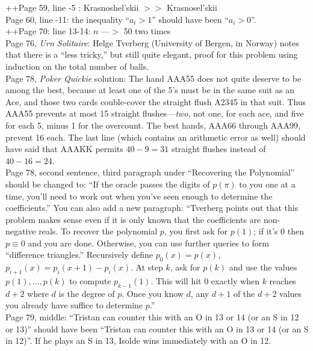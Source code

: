 \documentclass[11pt]{article}
\begin{document}
++Page 59, line -5 :  Krasnoshel'skii $>>$ Krasnosel'skii \\

Page 60, line -11: the inequality ``$a_i>1$'' should have been ``$a_i>0$''.\\

++Page 70: line 13-14: $n$ ---$>$ 50 two times\\ 

Page 76, {\em Urn Solitaire}: Helge Tverberg (University of Bergen, in Norway) notes
that there is a ``less tricky,'' but still quite elegant, proof for this problem using
induction on the total number of balls.\\

Page 78, {\em Poker Quickie} solution:  The hand AAA55 does not quite deserve to be among
the best, because at least one of the 5's must be in the same suit as an Ace, and those two cards
couble-cover the straight flush A2345 in that suit.  Thus AAA55 prevents at most 15 straight
flushes---{\em two}, not one, for each ace, and five for each 5, minus 1 for the overcount.
The best hands, AAA66 through AAA99, prevent 16 each.  The last line (which contains an arithmetic
error as well) should have said that AAAKK permits $40 - 9 = 31$ straight flushes instead of $40 - 16 = 24$. \\

Page 78, second sentence, third paragraph under ``Recovering the Polynomial'' should be changed to:
``If the oracle passes the digits of $p(\pi)$ to you one at a time, you'll need to work out when
you've seen enough to determine the coefficients.''  You can also add a new paragraph:
``Tverberg points out that this
problem makes sense even if it is only known that the coefficients are non-negative
reals.  To recover the polynomial $p$, you first ask for $p(1)$; if it's 0 then
$p \equiv 0$ and you are done.  Otherwise, you can use further queries to
form ``difference triangles.''  Recursively define $p_0(x) = p(x)$, $p_{i+1}(x) =
p_i(x{+}1)-p_i(x)$.  At step $k$, ask for $p(k)$ and use the values $p(1),\dots,p(k)$
to compute $p_{k-1}(1)$.  This will hit 0 exactly when $k$ reaches $d{+}2$ where $d$ is the degree
of $p$. Once you know $d$, any $d{+}1$ of the $d{+}2$ values you already have suffice to
determine $p$.''\\

Page 79, middle:  ``Tristan can counter this with an O in 13 or 14 (or an S in 12 or 13)'' should
have been ``Tristan can counter this with an O in 13 or 14 (or an S in 12)''.  If he plays an S in 13,
Isolde wins immediately with an O in 12.\\
\end{document}
